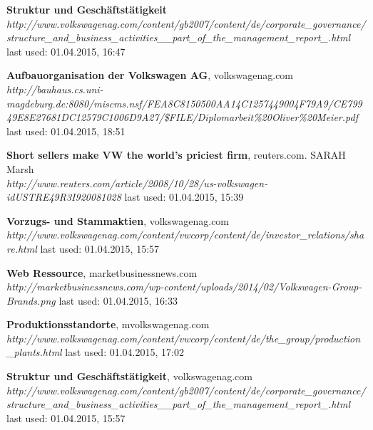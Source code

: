 \documentclass[12pt]{article}
\begin{document}
\begin{thebibliography}{56}
  \textbf{Struktur und Geschäftstätigkeit}\\
  \textit{http://www.volkswagenag.com/content/gb2007/content/de/corporate\_governance/structure\_and\_business\_activities\_\_part\_of\_the\_management\_report\_.html}
  \newline last used: 01.04.2015, 16:47
  
  \textbf{Aufbauorganisation der Volkswagen AG}, volkswagenag.com \\
  \textit{http://bauhaus.cs.uni-magdeburg.de:8080/miscms.nsf/FEA8C8150500AA14C1257449004F79A9/CE79949E8E27681DC12579C1006D9A27/\$FILE/Diplomarbeit\%20Oliver\%20Meier.pdf}
  \newline last used: 01.04.2015, 18:51  
  
 \textbf{Short sellers make VW the world's priciest firm}, reuters.com. SARAH Marsh \\
  \textit{  http://www.reuters.com/article/2008/10/28/us-volkswagen-idUSTRE49R3I920081028}
  \newline last used: 01.04.2015, 15:39  
  
 \textbf{Vorzugs- und Stammaktien}, volkswagenag.com \\
  \textit{   http://www.volkswagenag.com/content/vwcorp/content/de/investor\_relations/share.html}
  \newline last used: 01.04.2015, 15:57
  
 \textbf{Web Ressource}, marketbusinessnews.com \\
  \textit{   http://marketbusinessnews.com/wp-content/uploads/2014/02/Volkswagen-Group-Brands.png}
  \newline last used: 01.04.2015, 16:33
  
 \textbf{Produktionsstandorte}, mvolkswagenag.com \\
  \textit{   http://www.volkswagenag.com/content/vwcorp/content/de/the\_group/production\_plants.html}
  \newline last used: 01.04.2015, 17:02
  
 \textbf{Struktur und Geschäftstätigkeit}, volkswagenag.com \\
  \textit{	http://www.volkswagenag.com/content/gb2007/content/de/corporate\_governance/structure\_and\_business\_activities\_\_part\_of\_the\_management\_report\_.html}
  \newline last used: 01.04.2015, 15:57  


\end{thebibliography}
\end{document}
